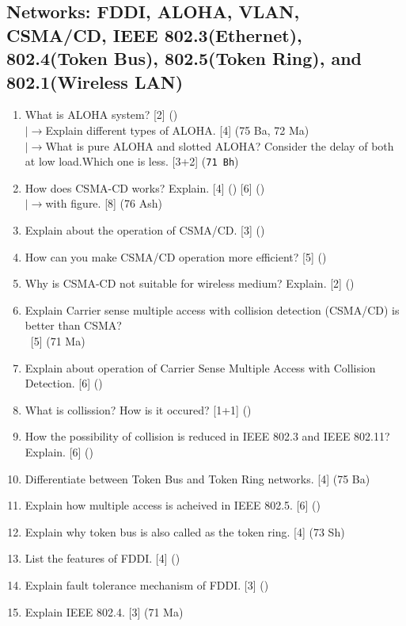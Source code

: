 \documentclass[12pt]{article}
\newcommand{\lb}{\\$\left|\rightarrow\right.$}
\newcommand{\enter}{\\\textcolor{white}{1}}
\begin{document}
	\subsection{Networks: FDDI, ALOHA, VLAN, CSMA/CD, IEEE 802.3(Ethernet), 802.4(Token Bus), 802.5(Token Ring), and 802.1(Wireless LAN)}
		\begin{enumerate}[noitemsep, topsep=0pt]
			\item What is ALOHA system? \hfill [2] ()
			\lb Explain different types of ALOHA. \hfill [4] (75 Ba, 72 Ma)
			\lb What is pure ALOHA and slotted ALOHA? Consider the delay of both at low load.Which one is less. \hfill [3+2] (\texttt{71 Bh})

			\item How does CSMA-CD works? Explain. \hfill [4] () [6] ()
			\lb with figure. \hfill [8] (76 Ash)

			\item Explain about the operation of CSMA/CD. \hfill [3] ()

			\item How can you make CSMA/CD operation more efficient? \hfill [5] ()

			\item Why is CSMA-CD not suitable for wireless medium? Explain. \hfill [2] ()
			
			\item Explain Carrier sense multiple access with collision detection (CSMA/CD) is better than CSMA?
			\enter \hfill[5] (71 Ma)

			\item Explain about operation of Carrier Sense Multiple Access with Collision Detection. \hfill [6] ()
			
			\item What is collission? How is it occured? \hfill [1+1] ()

			\item How the possibility of collision is reduced in IEEE 802.3 and IEEE 802.11? Explain. \hfill [6] ()

			\item Differentiate between Token Bus and Token Ring networks. \hfill [4] (75 Ba)
			
			\item Explain how multiple access is acheived in IEEE 802.5. \hfill[6] ()
			
			\item Explain why token bus is also called as the token ring. \hfill [4] (73 Sh)

			\item List the features of FDDI. \hfill [4] ()

			\item Explain fault tolerance mechanism of FDDI. \hfill [3] () 

			\item Explain IEEE 802.4. \hfill [3] (71 Ma)
		\end{enumerate}
			
\end{document}
